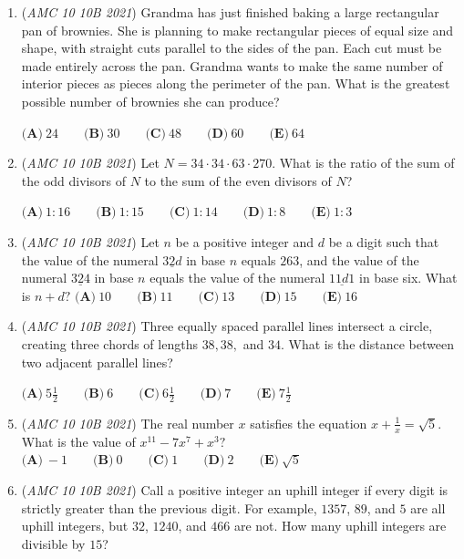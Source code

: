 \begin{enumerate}
	\item (\textit{AMC 10 10B 2021}) Grandma has just finished baking a large rectangular pan of brownies. She is planning to make rectangular pieces of equal size and shape, with straight cuts parallel to the sides of the pan. Each cut must be made entirely across the pan. Grandma wants to make the same number of interior pieces as pieces along the perimeter of the pan. What is the greatest possible number of brownies she can produce?


 $\textbf{(A)} ~24 \qquad\textbf{(B)} ~30 \qquad\textbf{(C)} ~48 \qquad\textbf{(D)} ~60 \qquad\textbf{(E)} ~64$


	\item (\textit{AMC 10 10B 2021}) Let $N = 34 \cdot 34 \cdot 63 \cdot 270$. What is the ratio of the sum of the odd divisors of $N$ to the sum of the even divisors of $N$?


 $\textbf{(A)} ~1 : 16 \qquad\textbf{(B)} ~1 : 15 \qquad\textbf{(C)} ~1 : 14 \qquad\textbf{(D)} ~1 : 8 \qquad\textbf{(E)} ~1 : 3$


	\item (\textit{AMC 10 10B 2021}) Let $n$ be a positive integer and $d$ be a digit such that the value of the numeral $\underline{32d}$ in base $n$ equals $263$, and the value of the numeral $\underline{324}$ in base $n$ equals the value of the numeral $\underline{11d1}$ in base six. What is $n + d ?$
$\textbf{(A)} ~10 \qquad\textbf{(B)} ~11 \qquad\textbf{(C)} ~13 \qquad\textbf{(D)} ~15 \qquad\textbf{(E)} ~16$


	\item (\textit{AMC 10 10B 2021}) Three equally spaced parallel lines intersect a circle, creating three chords of lengths $38, 38,$ and $34$. What is the distance between two adjacent parallel lines?


 $\textbf{(A)} ~5\frac{1}{2} \qquad\textbf{(B)} ~6 \qquad\textbf{(C)} ~6\frac{1}{2} \qquad\textbf{(D)} ~7 \qquad\textbf{(E)} ~7\frac{1}{2}$


	\item (\textit{AMC 10 10B 2021}) The real number $x$ satisfies the equation $x+\frac{1}{x} = \sqrt{5}$. What is the value of $x^{11}-7x^{7}+x^3?$
$\textbf{(A)} ~-1 \qquad\textbf{(B)} ~0 \qquad\textbf{(C)} ~1 \qquad\textbf{(D)} ~2 \qquad\textbf{(E)} ~\sqrt{5}$


	\item (\textit{AMC 10 10B 2021}) Call a positive integer an uphill integer if every digit is strictly greater than the previous digit. For example, $1357$, $89$, and $5$ are all uphill integers, but $32$, $1240$, and $466$ are not. How many uphill integers are divisible by $15$?



\end{enumerate}
